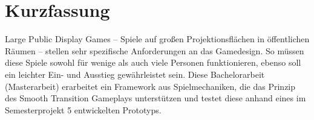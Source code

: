 \chapter{Kurzfassung}

Large Public Display Games -- Spiele auf großen Projektionsflächen in
öffentlichen Räumen -- stellen sehr spezifische Anforderungen an das
Gamedesign. So müssen diese Spiele sowohl für wenige als auch viele Personen
funktionieren, ebenso soll ein leichter Ein- und Ausstieg gewährleistet sein.
Diese Bachelorarbeit (Masterarbeit) erarbeitet ein Framework aus
Spielmechaniken, die das Prinzip des Smooth Transition Gameplays unterstützen
und testet diese anhand eines im Semesterprojekt 5 entwickelten Prototyps.
